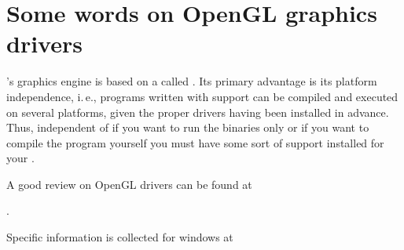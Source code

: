 \chapter{Some words on OpenGL graphics drivers\label{opengl}}

\FlightGear{}'s graphics engine is based on a  called
. Its primary advantage is its platform independence, i.\,e., programs
written with  support can be compiled and executed on several platforms,
given the proper drivers having been installed in advance. Thus, independent of if you
want to run the binaries only or if you want to compile the program yourself you must
have some sort of  support installed for your .

A good review  on OpenGL drivers can be found at
\medskip

.
 \medskip

 \noindent
 Specific information is collected for windows at
  \medskip

